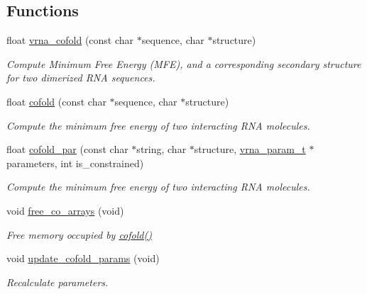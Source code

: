 \subsection*{Functions}
\begin{DoxyCompactItemize}
\item 
float \mbox{\hyperlink{group__mfe__cofold_ga9ef3a297201dbf838a8daff2b45c0c82}{vrna\+\_\+cofold}} (const char $\ast$sequence, char $\ast$structure)
\begin{DoxyCompactList}\small\item\em Compute Minimum Free Energy (M\+FE), and a corresponding secondary structure for two dimerized R\+NA sequences. \end{DoxyCompactList}\item 
float \mbox{\hyperlink{group__mfe__cofold_gabc8517f22cfe70595ee81fc837910d52}{cofold}} (const char $\ast$sequence, char $\ast$structure)
\begin{DoxyCompactList}\small\item\em Compute the minimum free energy of two interacting R\+NA molecules. \end{DoxyCompactList}\item 
float \mbox{\hyperlink{group__mfe__cofold_ga7612cfeeb1b793f1e4179b1eb53df1f3}{cofold\+\_\+par}} (const char $\ast$string, char $\ast$structure, \mbox{\hyperlink{group__energy__parameters_ga8a69ca7d787e4fd6079914f5343a1f35}{vrna\+\_\+param\+\_\+t}} $\ast$parameters, int is\+\_\+constrained)
\begin{DoxyCompactList}\small\item\em Compute the minimum free energy of two interacting R\+NA molecules. \end{DoxyCompactList}\item 
void \mbox{\hyperlink{group__mfe__cofold_gaafb33d7473eb9af9d1b168ca8761c41a}{free\+\_\+co\+\_\+arrays}} (void)
\begin{DoxyCompactList}\small\item\em Free memory occupied by \mbox{\hyperlink{group__mfe__cofold_gabc8517f22cfe70595ee81fc837910d52}{cofold()}} \end{DoxyCompactList}\item 
void \mbox{\hyperlink{group__mfe__cofold_ga4fcbf34e77b99bfbb2333d2ab0c41a57}{update\+\_\+cofold\+\_\+params}} (void)
\begin{DoxyCompactList}\small\item\em Recalculate parameters. \end{DoxyCompactList}\item 

\end{DoxyCompactItemize}
